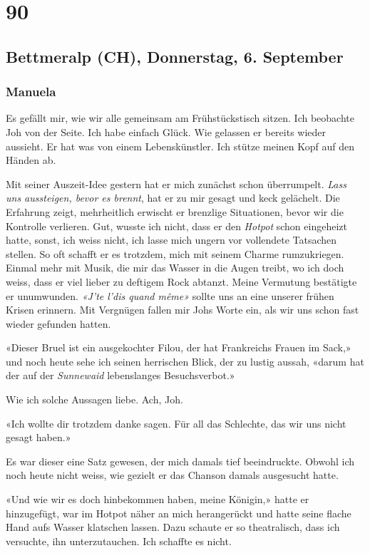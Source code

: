 \chapter{90}

\section{Bettmeralp (CH), Donnerstag, 6. 
September}

\subsection{Manuela}

Es gefällt mir, wie wir alle gemeinsam am Frühstückstisch sitzen.
Ich beobachte Joh von der Seite. Ich habe einfach Glück. Wie gelassen er
bereits wieder aussieht. Er hat was von einem Lebenskünstler. Ich stütze
meinen Kopf auf den Händen ab. 

\sectionbreak

Mit seiner Auszeit-Idee gestern hat er mich zunächst schon überrumpelt.
\emph{Lass uns aussteigen, bevor es brennt}, hat er zu mir gesagt und
keck gelächelt. Die Erfahrung zeigt, mehrheitlich erwischt er brenzlige
Situationen, bevor wir die Kontrolle verlieren. Gut, wusste ich nicht,
dass er den \emph{Hotpot} schon eingeheizt hatte, sonst, ich weiss
nicht, ich lasse mich ungern vor vollendete Tatsachen stellen. So oft
schafft er es trotzdem, mich mit seinem Charme rumzukriegen. Einmal mehr
mit Musik, die mir das Wasser in die Augen treibt, wo ich doch weiss,
dass er viel lieber zu deftigem Rock abtanzt. Meine Vermutung bestätigte
er unumwunden. \emph{«J’te l’dis quand même»} sollte uns an eine unserer frühen Krisen erinnern. Mit Vergnügen fallen mir Johs Worte ein, als wir uns schon fast wieder gefunden
hatten.

«Dieser Bruel ist ein ausgekochter Filou, der hat Frankreichs Frauen im
Sack,» und noch heute sehe ich seinen herrischen Blick, der zu lustig
aussah, «darum hat der auf der \emph{Sunnewaid} lebenslanges
Besuchsverbot.»

Wie ich solche Aussagen liebe. Ach, Joh.

«Ich wollte dir trotzdem danke sagen. Für all das Schlechte, das wir uns
nicht gesagt haben.»

Es war dieser eine Satz gewesen, der mich damals tief beeindruckte. Obwohl ich noch heute nicht weiss, 
wie gezielt er das Chanson damals ausgesucht hatte.

«Und wie wir es doch hinbekommen haben, meine Königin,» hatte er
hinzugefügt, war im Hotpot näher an mich herangerückt und hatte seine
flache Hand aufs Wasser klatschen lassen. Dazu schaute er so 
theatralisch, dass ich versuchte, ihn unterzutauchen. Ich schaffte es
nicht.

